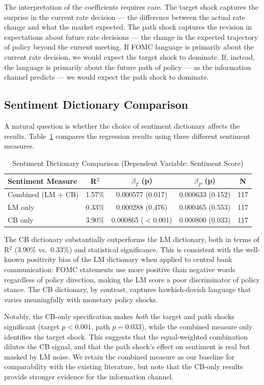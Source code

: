 \documentclass[12pt]{article}
\begin{document}
The interpretation of the coefficients requires care. The target shock captures the surprise in the current rate decision --- the difference between the actual rate change and what the market expected. The path shock captures the revision in expectations about future rate decisions --- the change in the expected trajectory of policy beyond the current meeting. If FOMC language is primarily about the current rate decision, we would expect the target shock to dominate. If, instead, the language is primarily about the future path of policy --- as the information channel predicts --- we would expect the path shock to dominate.

\subsection{Sentiment Dictionary Comparison}

A natural question is whether the choice of sentiment dictionary affects the results. Table~\ref{tab:sentiment_compare} compares the regression results using three different sentiment measures.

\begin{table}[tbp]
\centering
\caption{Sentiment Dictionary Comparison (Dependent Variable: Sentiment Score)}
\label{tab:sentiment_compare}
\begin{tabular}{lcccc}
\toprule
Sentiment Measure & R$^2$ & $\beta_T$ (p) & $\beta_P$ (p) & N \\
\midrule
Combined (LM + CB) & 1.57\% & 0.000577 (0.017) & 0.000633 (0.152) & 117 \\
LM only & 0.33\% & 0.000288 (0.476) & 0.000465 (0.553) & 117 \\
CB only & 3.90\% & 0.000865 ($<$0.001) & 0.000800 (0.033) & 117 \\
\bottomrule
\end{tabular}
\end{table}

The CB dictionary substantially outperforms the LM dictionary, both in terms of R$^2$ (3.90\% vs.\ 0.33\%) and statistical significance. This is consistent with the well-known positivity bias of the LM dictionary when applied to central bank communication: FOMC statements use more positive than negative words regardless of policy direction, making the LM score a poor discriminator of policy stance. The CB dictionary, by contrast, captures hawkish-dovish language that varies meaningfully with monetary policy shocks.

Notably, the CB-only specification makes \emph{both} the target and path shocks significant (target $p < 0.001$, path $p = 0.033$), while the combined measure only identifies the target shock. This suggests that the equal-weighted combination dilutes the CB signal, and that the path shock's effect on sentiment is real but masked by LM noise. We retain the combined measure as our baseline for comparability with the existing literature, but note that the CB-only results provide stronger evidence for the information channel.
\end{document}
